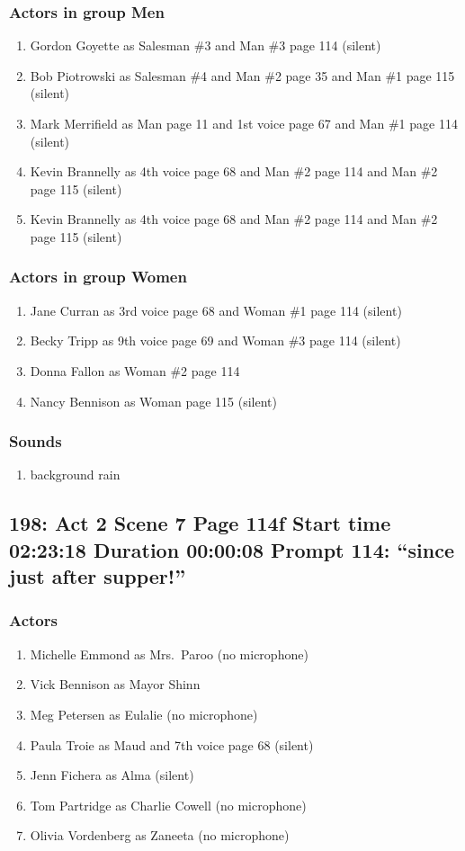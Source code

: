 \subsubsection{Actors in group Men}
\begin{enumerate}
\item Gordon Goyette as Salesman \#3 and Man \#3 page 114 (silent)
\item Bob Piotrowski as Salesman \#4 and Man \#2 page 35 and Man \#1 page 115 (silent)
\item Mark Merrifield as Man page 11 and 1st voice page 67 and Man \#1 page 114 (silent)
\item Kevin Brannelly as 4th voice page 68 and Man \#2 page 114 and Man \#2 page 115 (silent)
\item Kevin Brannelly as 4th voice page 68 and Man \#2 page 114 and Man \#2 page 115 (silent)
\end{enumerate}
\subsubsection{Actors in group Women}
\begin{enumerate}
\item Jane Curran as 3rd voice page 68 and Woman \#1 page 114 (silent)
\item Becky Tripp as 9th voice page 69 and Woman \#3 page 114 (silent)
\item Donna Fallon as Woman \#2 page 114
\item Nancy Bennison as Woman page 115 (silent)
\end{enumerate}

\subsubsection{Sounds}
\begin{enumerate}
\item background rain
\end{enumerate}
\subsection{198: Act 2 Scene 7 Page 114f Start time 02:23:18 Duration 00:00:08 Prompt 114: ``since just after supper!''}

\subsubsection{Actors}
\begin{enumerate}
\item Michelle Emmond as Mrs.~Paroo (no microphone)
\item Vick Bennison as Mayor Shinn
\item Meg Petersen as Eulalie (no microphone)
\item Paula Troie as Maud and 7th voice page 68 (silent)
\item Jenn Fichera as Alma (silent)
\item Tom Partridge as Charlie Cowell (no microphone)
\item Olivia Vordenberg as Zaneeta (no microphone)
\end{enumerate}
